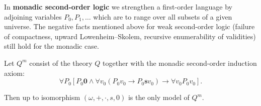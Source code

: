 In \textbf{monadic second-order logic} we strengthen a first-order language by adjoining variables $P_0, P_1, \ldots$ which are to range over all subsets of a given universe. The negative facts mentioned above for weak second-order logic (failure of compactness, upward Lowenheim--Skolem, recursive enumerability of validities) still hold for the monadic case.

Let $Q^m$ consist of the theory $Q$ together with the monadic second-order induction axiom:
$$\forall P_0 [P_0 \mathbf{0} \wedge \forall v_0 (P_0 v_0 \rightarrow P_0 \mathbf{s} v_0) \rightarrow \forall v_0 P_0 v_0].$$

Then up to isomorphism $(\omega, +, \cdot, s, 0)$ is the only model of $Q^m$.
